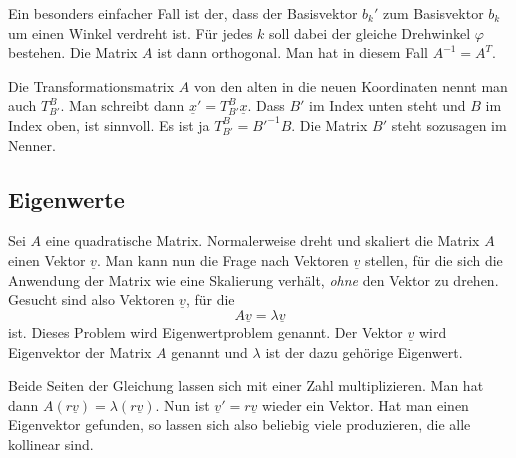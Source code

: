 \documentclass[a4paper,11pt,fleqn,twocolumn,twoside]{scrartcl}
\numberwithin{equation}{section}
\begin{document}
Ein besonders einfacher Fall ist der, dass der Basisvektor $b_k'$
zum Basisvektor $b_k$ um einen Winkel verdreht ist. Für jedes $k$
soll dabei der gleiche Drehwinkel $\varphi$ bestehen. Die Matrix
$A$ ist dann orthogonal. Man hat in diesem Fall $A^{-1}=A^T$. 

Die Transformationsmatrix $A$ von den
alten in die neuen Koordinaten nennt man auch $T_{B'}^B$.
Man schreibt dann $\underline x'=T_{B'}^B\underline x$.
Dass $B'$ im Index unten steht und $B$ im Index oben, ist sinnvoll.
Es ist ja $T_{B'}^B=B'^{-1}B$. Die Matrix $B'$ steht sozusagen
im Nenner.

\subsection{Eigenwerte}

Sei $A$ eine quadratische Matrix. Normalerweise dreht und skaliert
die Matrix $A$ einen Vektor $\underline v$. Man kann nun die Frage
nach Vektoren $\underline v$ stellen, für die sich die Anwendung
der Matrix wie eine Skalierung verhält, \textit{ohne} den Vektor zu
drehen. Gesucht sind also Vektoren $\underline v$, für die%
\begin{equation}
A\underline v = \lambda\underline v
\end{equation}
ist. Dieses Problem wird Eigenwertproblem genannt. Der Vektor
$\underline v$ wird Eigenvektor der Matrix $A$ genannt und
$\lambda$ ist der dazu gehörige Eigenwert.

Beide Seiten der Gleichung lassen sich mit einer Zahl multiplizieren.
Man hat dann $A(r\underline v)=\lambda(r\underline v)$.
Nun ist $\underline v'=r\underline v$ wieder ein Vektor.
Hat man einen Eigenvektor gefunden, so lassen sich also beliebig
viele produzieren, die alle kollinear sind.
\end{document}
